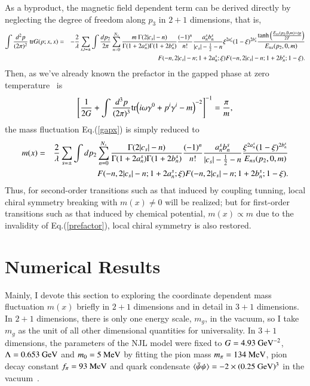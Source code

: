 \documentclass[aps,prd,amsmath,two column,amssymb,showpacs]{revtex4}
\begin{document}
\begin{widetext}
As a byproduct, the magnetic field dependent term can be derived directly by neglecting the degree of freedom along $p_3$ in $2+1$ dimensions, that is,
\begin{eqnarray}
\int{d^2p\over (2\pi)^2}~{\rm tr}G(p;x,x)&=&-{2\over\lambda}\sum_{s,t=\pm}\int{dp_2\over 2\pi}\sum_{n=0}^{N_s}{m~\Gamma(2|c_s|-n)\over \Gamma(1+2a_n^s)\Gamma(1+2b_n^s)}{(-1)^n\over n!}{a_n^sb_n^s\over|c_s|-{1\over2}-n}\xi^{2a_n^s}(1-\xi)^{2b_n^s}{\tanh\Big({E_{ns}(p_2,0,m)+t\mu\over2T}\Big)\over E_{ns}(p_2,0,m)}\nonumber\\
&&F(-n,2|c_s|-n;1+2a_n^s;\xi)F(-n,2|c_s|-n;1+2b_n^s;1-\xi).
\end{eqnarray} 
Then, as we've already known the prefactor in the gapped phase at zero temperature~\cite{Rosenstein:1990nm} is
\begin{eqnarray}\label{prefactor}
\left[{1\over 2G}+\int{d^3p\over (2\pi)^3}{\rm tr}\Big(i\omega\gamma^0+p^i\gamma^i-m\Big)^{-2}\right]^{-1}={\pi\over m},
\end{eqnarray}
the mass fluctuation Eq.(\ref{gapx}) is simply reduced to
\begin{eqnarray}
m(x)&=&{2\over\lambda}\sum_{s=\pm}\int{dp_2}\sum_{n=0}^{N_s}{\Gamma(2|c_s|-n)\over \Gamma(1+2a_n^s)\Gamma(1+2b_n^s)}{(-1)^n\over n!}{a_n^sb_n^s\over|c_s|-{1\over2}-n}{\xi^{2a_n^s}(1-\xi)^{2b_n^s}\over E_{ns}(p_2,0,m)}\nonumber\\
&&F(-n,2|c_s|-n;1+2a_n^s;\xi)F(-n,2|c_s|-n;1+2b_n^s;1-\xi).
\end{eqnarray} 
Thus, for second-order transitions such as that induced by coupling tunning, local chiral symmetry breaking with $m(x)\neq0$ will be realized; but for first-order transitions such as that induced by chemical potential, $m(x)\propto m$ due to the invalidity of Eq.(\ref{prefactor}), local chiral symmetry is also restored.
\end{widetext}
\section{Numerical Results}\label{results}
Mainly, I devote this section to exploring the coordinate dependent mass fluctuation $m(x)$ briefly in $2+1$ dimensions and in detail in $3+1$ dimensions. In $2+1$ dimensions, there is only one energy scale, $m_g$, in the vacuum, so I take $m_g$ as the unit of all other dimensional quantities for universality. In $3+1$ dimensions, the parameters of the NJL model were fixed to $G=4.93~{\rm GeV}^{-2}$, $\Lambda=0.653~{\rm GeV}$ and $m_0=5~{\rm MeV}$ by fitting the pion mass $m_\pi=134~{\rm MeV}$, pion decay constant $f_\pi=93~{\rm MeV}$ and quark condensate $\langle\bar\psi\psi\rangle=-2\times (0.25~{\rm GeV})^3$ in the vacuum~\cite{Zhuang:1994dw}. 
\end{document}
